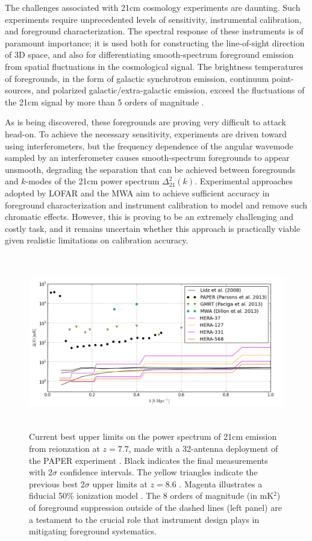 \documentclass[preprint]{aastex}
\begin{document}
The challenges associated with 21cm cosmology experiments are daunting.  Such
experiments require unprecedented levels of sensitivity, instrumental
calibration, and foreground characterization.  The spectral response of these
instruments is of paramount importance; it is used both for constructing the
line-of-sight direction of 3D space, and also for differentiating
smooth-spectrum foreground emission from spatial fluctuations in the
cosmological signal. The brightness temperatures of foregrounds, in the form of
galactic synchrotron emission, continuum point-sources, and polarized
galactic/extra-galactic emission, exceed the fluctuations of the 21cm signal by
more than 5 orders of magnitude
\citep{santos_et_al2005,pritchard_loeb2012,pober_et_al2013b}.

As is being discovered, these foregrounds are proving very difficult to attack
head-on.  To achieve the necessary sensitivity, experiments are driven toward
using interferometers, but the frequency dependence of the angular wavemode
sampled by an interferometer causes smooth-spectrum foregrounds to appear
unsmooth, degrading the separation that can be achieved between foregrounds and
$k$-modes of the 21cm power spectrum $\Delta^2_{21}(k)$.  
Experimental approaches adopted by LOFAR and the MWA aim to achieve sufficient
accuracy in foreground characterization and instrument calibration to model and
remove such chromatic effects.  However, this is proving to be an extremely
challenging and costly task, and it remains uncertain whether this approach is
practically viable given realistic limitations on calibration accuracy.

\begin{figure}[!ht]\centering
\includegraphics[height=3.0in]{plots/eor_pspec.png}
\caption{\small
Current best upper limits on the power spectrum of 21cm emission from
reionzation at $z=7.7$, made with a 32-antenna deployment of the PAPER
experiment \citep{parsons_et_al2013}. Black indicates the final measurements
with 2$\sigma$ confidence intervals. The yellow triangles indicate the previous
best 2$\sigma$ upper limits at $z=8.6$ \citep{paciga_et_al2013}. Magenta
illustrates a fiducial 50\% ionization model \citep{lidz_et_al2008}. The 8
orders of magnitude (in mK$^2$) of foreground suppression outside of the dashed
lines (left panel) are a testament to the crucial role that instrument design
plays in mitigating foreground systematics.
}\label{fig:eor_pspec}
\end{figure}
\end{document}
